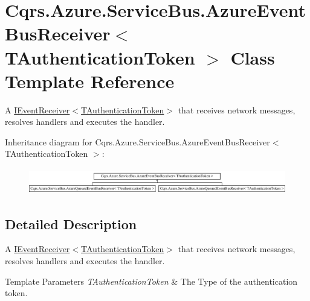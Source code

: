 \hypertarget{classCqrs_1_1Azure_1_1ServiceBus_1_1AzureEventBusReceiver}{}\section{Cqrs.\+Azure.\+Service\+Bus.\+Azure\+Event\+Bus\+Receiver$<$ T\+Authentication\+Token $>$ Class Template Reference}
\label{classCqrs_1_1Azure_1_1ServiceBus_1_1AzureEventBusReceiver}


A \hyperlink{interfaceCqrs_1_1Events_1_1IEventReceiver}{I\+Event\+Receiver$<$\+T\+Authentication\+Token$>$} that receives network messages, resolves handlers and executes the handler.  


Inheritance diagram for Cqrs.\+Azure.\+Service\+Bus.\+Azure\+Event\+Bus\+Receiver$<$ T\+Authentication\+Token $>$\+:\begin{figure}[H]
\begin{center}
\leavevmode
\includegraphics[height=1.154639cm]{classCqrs_1_1Azure_1_1ServiceBus_1_1AzureEventBusReceiver}
\end{center}
\end{figure}


\subsection{Detailed Description}
A \hyperlink{interfaceCqrs_1_1Events_1_1IEventReceiver}{I\+Event\+Receiver$<$\+T\+Authentication\+Token$>$} that receives network messages, resolves handlers and executes the handler. 


\begin{DoxyTemplParams}{Template Parameters}
{\em T\+Authentication\+Token} & The Type of the authentication token.\\
\hline
\end{DoxyTemplParams}
